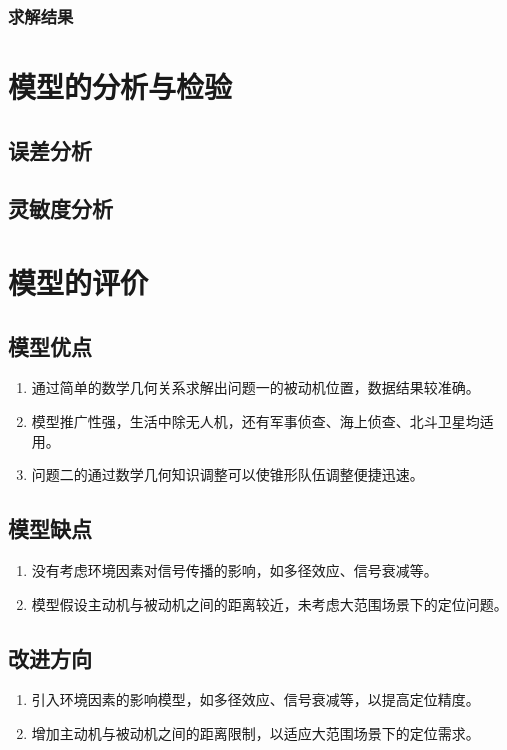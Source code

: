 \documentclass[withoutpreface,bwprint]{cumcmthesis} %
\begin{document}
\subsubsection{求解结果}

\section{模型的分析与检验}
\subsection{误差分析}
\subsection{灵敏度分析}


\section{模型的评价}
\subsection{模型优点}
\begin{enumerate}
    \item 通过简单的数学几何关系求解出问题一的被动机位置，数据结果较准确。
    \item 模型推广性强，生活中除无人机，还有军事侦查、海上侦查、北斗卫星均适用。
    \item 问题二的通过数学几何知识调整可以使锥形队伍调整便捷迅速。
\end{enumerate}

\subsection{模型缺点}
\begin{enumerate}
    \item 没有考虑环境因素对信号传播的影响，如多径效应、信号衰减等。
    \item 模型假设主动机与被动机之间的距离较近，未考虑大范围场景下的定位问题。
\end{enumerate}

\subsection{改进方向}
\begin{enumerate}
    \item 引入环境因素的影响模型，如多径效应、信号衰减等，以提高定位精度。
    \item 增加主动机与被动机之间的距离限制，以适应大范围场景下的定位需求。
\end{enumerate}
\end{document}
